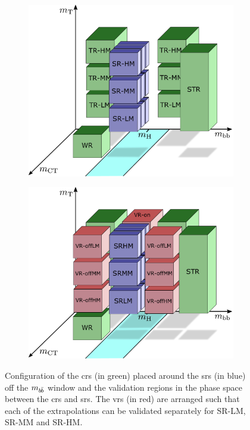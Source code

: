  \begin{figure}[t]
	\centering
	\begin{subfigure}[b]{0.45\linewidth}
		\centering\includegraphics[width=1.0\textwidth]{strategy_5}
		\caption{\label{fig:cr_strategy}}
	\end{subfigure}\hfill
	\begin{subfigure}[b]{0.45\linewidth}
		\centering\includegraphics[width=1.0\textwidth]{strategy_7}
		\caption{\label{fig:vr_strategy}}
	\end{subfigure}\hfill

	\caption{Configuration of  the \glspl{cr} (in green) placed around the \glspl{sr} (in blue) off the $m_{b\hspace{-0.06em}\bar{b}}$ window and  the validation regions in the phase space between the \glspl{cr} and \glspl{sr}. The \glspl{vr} (in red) are arranged such that each of the extrapolations can be validated separately for SR-LM, SR-MM and SR-HM.}
	\label{fig:strategies_vr_cr}
\end{figure}

